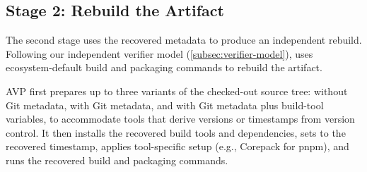 \subsection{Stage 2: Rebuild the Artifact}

The second stage uses the recovered metadata to produce an independent rebuild.
Following our independent verifier model (\cref{subsec:verifier-model}), \toolname uses ecosystem-default build and packaging commands to rebuild the artifact.

AVP first prepares up to three variants of the checked-out source tree: without Git metadata, with Git metadata, and with Git metadata plus build-tool  variables, to accommodate tools that derive versions or timestamps from version control. 
It then installs the recovered build tools and dependencies, sets  to the recovered timestamp, applies tool-specific setup (e.g., Corepack for pnpm), and runs the recovered build and packaging commands.



